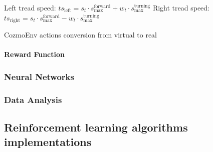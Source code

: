 \begin{algorithm}[!h]
	\SetAlgoLined
	\small
	\DontPrintSemicolon
	\LinesNumbered

	Left tread speed: $ts_{\text{left}} = s_t \cdot s^{\text{forward}}_{\text{max}} + w_t \cdot s^{\text{turning}}_{\text{max}}$\;
	Right tread speed: $ts_{\text{right}} = s_t \cdot s^{\text{forward}}_{\text{max}} - w_t \cdot s^{\text{turning}}_{\text{max}}$

	\caption{CozmoEnv actions conversion from virtual to real}
	\label{conversionCozmoEnv}
\end{algorithm}

\paragraph{Reward Function}

\subsubsection{Neural Networks}

\subsubsection{Data Analysis}

\subsection{Reinforcement learning algorithms implementations}



